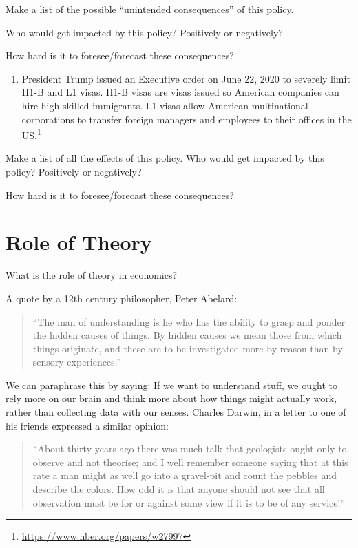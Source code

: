 \documentclass[
]{book}
\providecommand{\tightlist}{%
  \setlength{\itemsep}{0pt}\setlength{\parskip}{0pt}}
\begin{document}
Make a list of the possible ``unintended consequences'' of this policy.

Who would get impacted by this policy? Positively or negatively?

How hard is it to foresee/forecast these consequences?

\begin{enumerate}
\def\labelenumi{\arabic{enumi}.}
\setcounter{enumi}{1}
\tightlist
\item
  President Trump issued an Executive order on June 22, 2020 to severely limit H1-B and L1 visas. H1-B visas are visas issued so American companies can hire high-skilled immigrants. L1 visas allow American multinational corporations to transfer foreign managers and employees to their offices in the US.\footnote{\url{https://www.nber.org/papers/w27997}}
\end{enumerate}

Make a list of all the effects of this policy. Who would get impacted by this policy? Positively or negatively?

How hard is it to foresee/forecast these consequences?

\hypertarget{role-of-theory}{%
\section{Role of Theory}\label{role-of-theory}}

What is the role of theory in economics?

A quote by a 12th century philosopher, Peter Abelard:

\begin{quote}
``The man of understanding is he who has the ability to grasp and ponder the hidden causes of things. By hidden causes we mean those from which things originate, and these are to be investigated more by reason than by sensory experiences.''
\end{quote}

We can paraphrase this by saying: If we want to understand stuff, we ought to rely more on our brain and think more about how things might actually work, rather than collecting data with our senses.
Charles Darwin, in a letter to one of his friends expressed a similar opinion:

\begin{quote}
``About thirty years ago there was much talk that geologists ought only to observe and not theorise; and I well remember someone saying that at this rate a man might as well go into a gravel-pit and count the pebbles and describe the colors. How odd it is that anyone should not see that all observation must be for or against some view if it is to be of any service!''
\end{quote}
\end{document}
